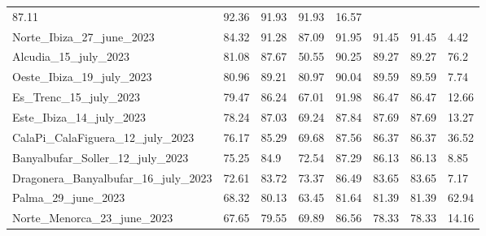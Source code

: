 \begin{table}[H]
\begin{tabular}{llllllll}
        87.11                                  & 92.36     &
        91.93                                  & 91.93     & 16.57
        \\
        Norte\_Ibiza\_27\_june\_2023           & 84.32     & 91.28      &
        87.09                                  & 91.95     &
        91.45                                  & 91.45     & 4.42
        \\
        Alcudia\_15\_july\_2023                & 81.08     & 87.67      &
        50.55                                  & 90.25     &
        89.27                                  & 89.27     & 76.2
        \\
        Oeste\_Ibiza\_19\_july\_2023           & 80.96     & 89.21      &
        80.97                                  & 90.04     &
        89.59                                  & 89.59     & 7.74
        \\
        Es\_Trenc\_15\_july\_2023              & 79.47     & 86.24      &
        67.01                                  & 91.98     &
        86.47                                  & 86.47     & 12.66
        \\
        Este\_Ibiza\_14\_july\_2023            & 78.24     & 87.03      &
        69.24                                  & 87.84     &
        87.69                                  & 87.69     & 13.27
        \\
        CalaPi\_CalaFiguera\_12\_july\_2023    & 76.17     & 85.29      &
        69.68                                  & 87.56     &
        86.37                                  & 86.37     & 36.52
        \\
        Banyalbufar\_Soller\_12\_july\_2023    & 75.25     & 84.9       &
        72.54                                  & 87.29     &
        86.13                                  & 86.13     & 8.85
        \\
        Dragonera\_Banyalbufar\_16\_july\_2023 & 72.61     & 83.72      &
        73.37                                  & 86.49     &
        83.65                                  & 83.65     & 7.17
        \\
        Palma\_29\_june\_2023                  & 68.32     & 80.13      &
        63.45                                  & 81.64     &
        81.39                                  & 81.39     & 62.94
        \\
        Norte\_Menorca\_23\_june\_2023         & 67.65     & 79.55      &
        69.89                                  & 86.56     &
        78.33                                  & 78.33     & 14.16

\end{tabular}
\end{table}

